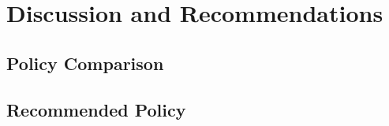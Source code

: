 \documentclass[11pt,a4paper]{article}
\begin{document}
\section{Discussion and Recommendations}

\subsection{Policy Comparison}

\subsection{Recommended Policy}

\pagebreak


\end{document}
